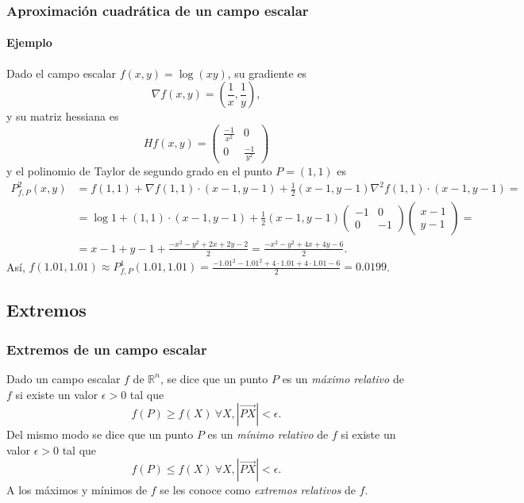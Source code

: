 \begin{frame}
\frametitle{Aproximación cuadrática de un campo escalar}
\framesubtitle{Ejemplo}
Dado el campo escalar $f(x,y)=\log(xy)$, su gradiente es
\[
\nabla f(x,y) = \left(\frac{1}{x},\frac{1}{y}\right),
\]
y su matriz hessiana es 
\[
Hf(x,y) = \left(
\begin{array}{cc}
\frac{-1}{x^2} & 0\\
0 & \frac{-1}{y^2}
\end{array}
\right)
\]
y el polinomio de Taylor de segundo grado en el punto $P=(1,1)$ es
\begin{align*}
P^2_{f,P}(x,y) &= f(1,1) +\nabla f(1,1)\cdot (x-1,y-1) + \frac{1}{2}(x-1,y-1)\nabla^2f(1,1)\cdot(x-1,y-1)=\\
&= \log 1+(1,1)\cdot(x-1,y-1) + \frac{1}{2}(x-1,y-1)
\left(
\begin{array}{cc}
-1 & 0\\
0 & -1
\end{array}
\right)
\left(
\begin{array}{c}
x-1\\
y-1
\end{array}
\right)
= \\
&= x-1+y-1+\frac{-x^2-y^2+2x+2y-2}{2} = \frac{-x^2-y^2+4x+4y-6}{2}.
\end{align*}
Así, $f(1.01,1.01) \approx P^1_{f,P}(1.01,1.01) = \frac{-1.01^2-1.01^2+4\cdot 1.01+4\cdot 1.01-6}{2} = 0.0199$.
\end{frame}


\subsection{Extremos}
\begin{frame}
\frametitle{Extremos de un campo escalar}
\begin{definicion}
Dado un campo escalar $f$ de $\mathbb{R}^n$, se dice que un punto $P$ es un \emph{máximo relativo} de $f$ si existe un valor $\epsilon>0$ tal que
\[
f(P)\geq f(X)\ \forall X, |\vec{PX}|<\epsilon.
\] 
Del mismo modo se dice que un punto $P$ es un \emph{mínimo relativo} de $f$ si existe un valor $\epsilon>0$ tal que
\[
f(P)\leq f(X)\ \forall X, |\vec{PX}|<\epsilon.
\] 
A los máximos y mínimos de $f$ se les conoce como \emph{extremos relativos} de $f$.
\end{definicion}
\end{frame}


